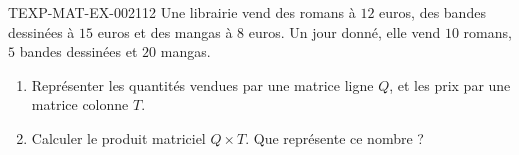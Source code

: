 \begin{exercice}{TEXP-MAT-EX-002}{1}{12}
Une librairie vend des romans à $12$ euros, des bandes dessinées à $15$ euros et des mangas à $8$ euros. Un jour donné, elle vend $10$ romans, $5$ bandes dessinées et $20$ mangas.
\begin{enumerate}
  \item Représenter les quantités vendues par une matrice ligne $Q$, et les prix par une matrice colonne $T$.
  \item Calculer le produit matriciel $Q\times T$. Que représente ce nombre ?
\end{enumerate}
\end{exercice}
